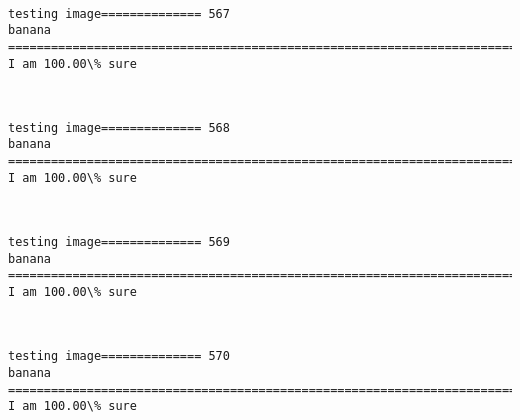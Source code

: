 \documentclass[11pt]{article}
\begin{document}
    \begin{center}
    \end{center}
    { \hspace*{\fill} \\}
    
    \begin{Verbatim}[commandchars=\\\{\}]
testing image============== 567
banana
============================================================================
I am 100.00\% sure

    \end{Verbatim}

    \begin{center}
    \end{center}
    { \hspace*{\fill} \\}
    
    \begin{Verbatim}[commandchars=\\\{\}]
testing image============== 568
banana
============================================================================
I am 100.00\% sure

    \end{Verbatim}

    \begin{center}
    \end{center}
    { \hspace*{\fill} \\}
    
    \begin{Verbatim}[commandchars=\\\{\}]
testing image============== 569
banana
============================================================================
I am 100.00\% sure

    \end{Verbatim}

    \begin{center}
    \end{center}
    { \hspace*{\fill} \\}
    
    \begin{Verbatim}[commandchars=\\\{\}]
testing image============== 570
banana
============================================================================
I am 100.00\% sure

    \end{Verbatim}
\end{document}
